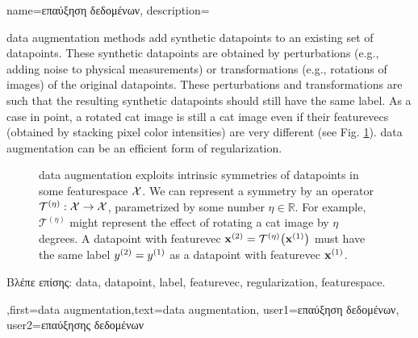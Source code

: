 {name={\foreignlanguage{greek}{επαύξηση δεδομένων}},
	description={\Gls{data} augmentation methods add synthetic \gls{datapoint}s 
		to an existing set of \gls{datapoint}s. These synthetic \gls{datapoint}s are obtained by 
		perturbations (e.g., adding noise to physical measurements) or transformations 
		(e.g., rotations of images) of the original \gls{datapoint}s. These perturbations and 
		transformations are such that the resulting synthetic \gls{datapoint}s should 
		still have the same \gls{label}. As a case in point, a rotated cat image is still 
		a cat image even if their \gls{featurevec}s (obtained by stacking pixel color intensities) 
		are very different (see Fig. \ref{fig_symmetry_dataaug_dict}). \Gls{data} augmentation can be an 
		efficient form of \gls{regularization}.
		\begin{figure}[H]
		\begin{center}
			  \vspace*{-11mm}
		\end{center}
		\caption{\Gls{data} augmentation exploits intrinsic symmetries of \gls{datapoint}s in 
		       some \gls{featurespace} $\mathcal{X}$. We can represent a symmetry by 
		     an operator $\mathcal{T}^{(\eta)}: \mathcal{X} \rightarrow \mathcal{X}$,
		     parametrized by some number $\eta \in \mathbb{R}$. For example, $\mathcal{T}^{(\eta)}$ 
		    might represent the effect of rotating a cat image by $\eta$ degrees. A \gls{datapoint} 
		    with \gls{featurevec} ${\bf x}^{(2)} = \mathcal{T}^{(\eta)} \big({\bf x}^{(1)} \big)$ must 
		    have the same \gls{label} $y^{(2)}=y^{(1)}$ as a \gls{datapoint} 
		     with \gls{featurevec} ${\bf x}^{(1)}$.\label{fig_symmetry_dataaug_dict}}
		 \end{figure} 
		 \foreignlanguage{greek}{Βλέπε επίσης:} \gls{data}, \gls{datapoint}, \gls{label}, \gls{featurevec}, \gls{regularization}, \gls{featurespace}.
		 },first={data augmentation},text={data augmentation},
		 user1={\foreignlanguage{greek}{επαύξηση δεδομένων}}, %
  		 user2={\foreignlanguage{greek}{επαύξησης δεδομένων}} %
}

